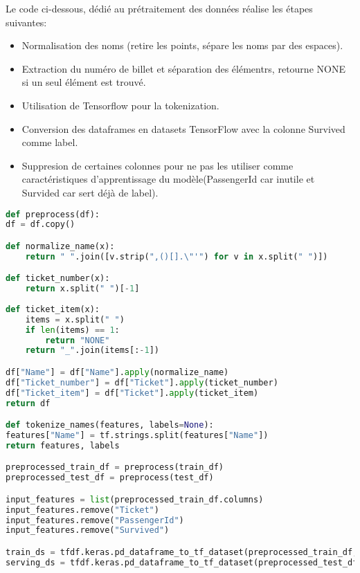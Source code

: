 \documentclass[9pt]{article}
\begin{document}
\noindent Le code ci-dessous, dédié au prétraitement des données réalise les étapes suivantes:
\begin{itemize}
    \item Normalisation des noms (retire les points, sépare les noms par des espaces).
    \item Extraction du numéro de billet et séparation des élémentrs, retourne NONE si un seul élément est
    trouvé.
    \item Utilisation de Tensorflow pour la tokenization.
    \item Conversion des dataframes en datasets TensorFlow avec la colonne Survived comme label.
    \item Suppresion de certaines colonnes pour ne pas les utiliser comme caractéristiques d'apprentissage
    du modèle(PassengerId car inutile et Survided car sert déjà de label).
\end{itemize}
\begin{lstlisting}[language=Python, caption={Traitement des données}]
def preprocess(df):
df = df.copy()

def normalize_name(x):
    return " ".join([v.strip(",()[].\"'") for v in x.split(" ")])

def ticket_number(x):
    return x.split(" ")[-1]
    
def ticket_item(x):
    items = x.split(" ")
    if len(items) == 1:
        return "NONE"
    return "_".join(items[:-1])

df["Name"] = df["Name"].apply(normalize_name)
df["Ticket_number"] = df["Ticket"].apply(ticket_number)
df["Ticket_item"] = df["Ticket"].apply(ticket_item)
return df

def tokenize_names(features, labels=None):
features["Name"] = tf.strings.split(features["Name"])
return features, labels

preprocessed_train_df = preprocess(train_df)
preprocessed_test_df = preprocess(test_df)

input_features = list(preprocessed_train_df.columns)
input_features.remove("Ticket")
input_features.remove("PassengerId")
input_features.remove("Survived")

train_ds = tfdf.keras.pd_dataframe_to_tf_dataset(preprocessed_train_df, label="Survived").map(tokenize_names)
serving_ds = tfdf.keras.pd_dataframe_to_tf_dataset(preprocessed_test_df).map(tokenize_names)
\end{lstlisting}



\clearpage
\end{document}

